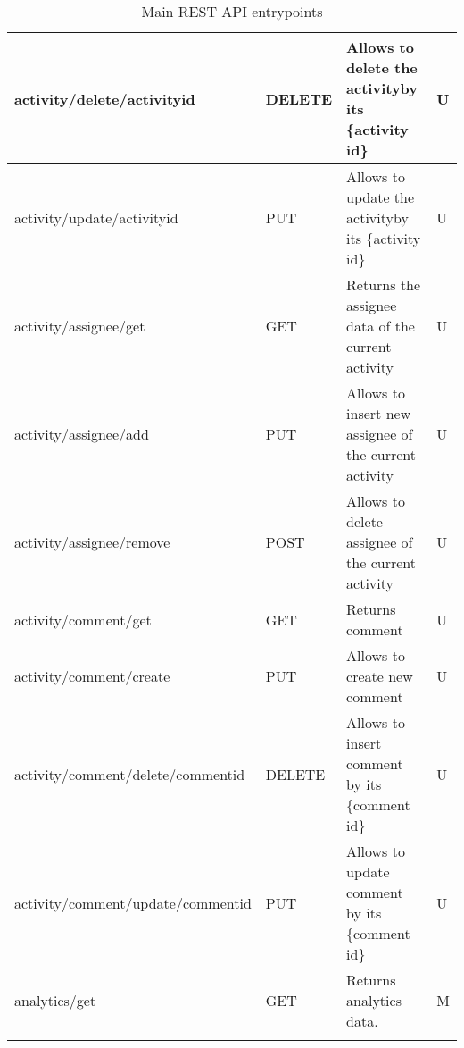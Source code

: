 \begin{longtable}{|p{}|p{} |p{}|p{}|}
activity/delete/{activityid}       & DELETE & Allows to delete the activityby its \{activity id\} & U \\ \hline
activity/update/{activityid}       & PUT    & Allows to update the activityby its \{activity id\}  & U \\ \hline
activity/assignee/get              & GET    & Returns the assignee data of the current activity & U \\ \hline
activity/assignee/add              & PUT    & Allows to insert new assignee of the current activity & U \\ \hline
activity/assignee/remove           & POST   & Allows to delete assignee of the current activity & U \\ \hline
activity/comment/get               & GET    & Returns comment  & U \\ \hline
activity/comment/create            & PUT    & Allows to create new comment & U \\ \hline
activity/comment/delete/{commentid}& DELETE & Allows to insert comment by its \{comment id\} & U \\ \hline
activity/comment/update/{commentid}& PUT    & Allows to update comment by its \{comment id\}  & U \\ \hline
analytics/get                      & GET    & Returns analytics data. & M \\ \hline
\caption{Main REST API entrypoints}



\label{tab:termGlossary}
\end{longtable}